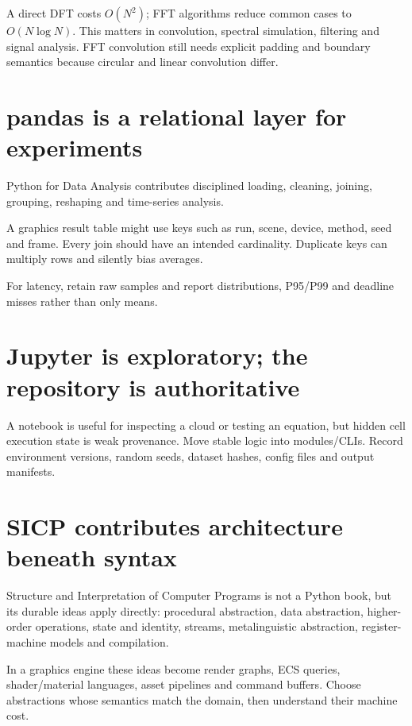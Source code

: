 A direct DFT costs \(O(N^2)\); FFT algorithms reduce common cases to \(O(N\log N)\). This matters in convolution, spectral simulation, filtering and signal analysis. FFT convolution still needs explicit padding and boundary semantics because circular and linear convolution differ.

\section{pandas is a relational layer for experiments}\label{01-foundations-i-ch017-pandas-is-a-relational-layer-for-experiments}

Python for Data Analysis contributes disciplined loading, cleaning, joining, grouping, reshaping and time-series analysis.

A graphics result table might use keys such as run, scene, device, method, seed and frame. Every join should have an intended cardinality. Duplicate keys can multiply rows and silently bias averages.

For latency, retain raw samples and report distributions, P95/P99 and deadline misses rather than only means.

\section{Jupyter is exploratory; the repository is authoritative}\label{01-foundations-i-ch017-jupyter-is-exploratory-the-repository-is-authoritative}

A notebook is useful for inspecting a cloud or testing an equation, but hidden cell execution state is weak provenance. Move stable logic into modules/CLIs. Record environment versions, random seeds, dataset hashes, config files and output manifests.

\section{SICP contributes architecture beneath syntax}\label{01-foundations-i-ch017-sicp-contributes-architecture-beneath-syntax}

Structure and Interpretation of Computer Programs is not a Python book, but its durable ideas apply directly: procedural abstraction, data abstraction, higher-order operations, state and identity, streams, metalinguistic abstraction, register-machine models and compilation.

In a graphics engine these ideas become render graphs, ECS queries, shader/material languages, asset pipelines and command buffers. Choose abstractions whose semantics match the domain, then understand their machine cost.


